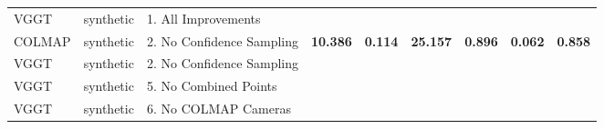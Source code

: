\begin{table}[H]
\begin{tabular}{lllrrrrrr}
\midrule
VGGT & synthetic & 1. All Improvements &  &  &  &  &  &  \\
COLMAP & synthetic & 2. No Confidence Sampling & \textbf{10.386} & \textbf{0.114} & \textbf{25.157} & \textbf{0.896} & \textbf{0.062} & \textbf{0.858} \\
VGGT & synthetic & 2. No Confidence Sampling &  &  &  &  &  &  \\
VGGT & synthetic & 5. No Combined Points &  &  &  &  &  &  \\
VGGT & synthetic & 6. No COLMAP Cameras &  &  &  &  &  &  \\
\bottomrule
\end{tabular}
\end{table}